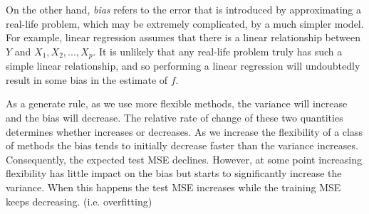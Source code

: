 \documentclass[11pt,a4paper]{report}
\begin{document}
\noindent On the other hand, \emph{bias} refers to the error that is
introduced by approximating a real-life problem, which may be
extremely complicated, by a much simpler model. For example, linear
regression assumes that there is a linear relationship between $Y$ and
$X_1,X_2,...,X_p$. It is unlikely that any real-life problem truly has
such a simple linear relationship, and so performing a linear
regression will undoubtedly result in some bias in the estimate of
$f$.

\noindent As a generate rule, as we use more flexible methods, the
variance will increase and the bias will decrease. The relative rate
of change of these two quantities determines whether increases or
decreases. As we increase the flexibility of a class of methods the
bias tends to initially decrease faster than the variance increases.
Consequently, the expected test MSE declines. However, at some point
increasing flexibility has little impact on the bias but starts to
significantly increase the variance. When this happens the test MSE
increases while the training MSE keeps decreasing. (i.e. overfitting)
\end{document}
